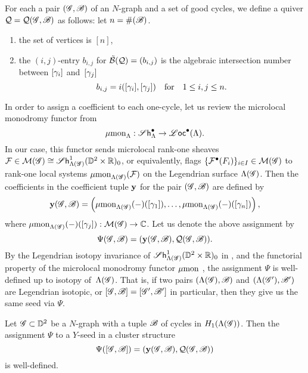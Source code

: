 \begin{definition} 
For each a pair $(\mathscr{G}, \mathscr{B})$ of an $N$-graph and a set of good cycles, we define a quiver $\mathcal{Q}=\mathcal{Q}(\mathscr{G},\mathscr{B})$ as follows: let $n=\#(\mathscr{B})$.
\begin{enumerate}
\item the set of vertices is $[n]$, 
\item the $(i,j)$-entry $b_{i,j}$ for $\mathcal{\tilde{B}}(\mathcal{Q})=(b_{i,j})$ is the algebraic intersection number between $[\gamma_i]$ and~$[\gamma_j]$
\[
b_{i,j} = i([\gamma_i], [\gamma_j])\quad\text{for}\quad 1\le i, j\le n.
\]
\end{enumerate}
\end{definition}

In order to assign a coefficient to each one-cycle, let us review  the microlocal monodromy functor from \cite{STZ2017}
\[
\operatorname{\mu mon}_\Lambda:\operatorname{\mathscr{S}\mathsf{h}}_\Lambda^\bullet \to\operatorname{\mathscr{L}\mathsf{oc}}^\bullet(\Lambda).
\]
In our case, this functor sends microlocal rank-one sheaves $\mathcal{F} \in \mathcal{M}(\mathscr{G})\cong \operatorname{\mathscr{S}\mathsf{h}}_{\Lambda(\mathscr{G})}^1(\mathbb{D}^2\times \mathbb{R})_0$, or equivalently, flags $\{\mathcal{F}^\bullet(F_i)\}_{i \in I}\in\mathcal{M}(\mathscr{G})$ to rank-one local systems $\operatorname{\mu mon}_{\Lambda(\mathscr{G})}(\mathcal{F})$ on the Legendrian surface $\Lambda(\mathscr{G})$. 
Then the coefficients in the coefficient tuple $\mathbf{y}$ for the pair $(\mathscr{G}, \mathscr{B})$ are defined by
\[
\mathbf{y}(\mathscr{G},\mathscr{B})=\left(
\operatorname{\mu mon}_{\Lambda(\mathscr{G})}(-)([\gamma_1]),
\dots,
\operatorname{\mu mon}_{\Lambda(\mathscr{G})}(-)([\gamma_n])\right),
\]
where $\operatorname{\mu mon}_{\Lambda(\mathscr{G})}(-)([\gamma_j]):\mathcal{M}(\mathscr{G})\to \mathbb{C}$.  
Let us denote the above assignment by 
\[
\Psi(\mathscr{G}, \mathscr{B})=(\mathbf{y}(\mathscr{G}, \mathscr{B}),\mathcal{Q}(\mathscr{G},\mathscr{B})).
\]
By the Legendrian isotopy invariance of $\operatorname{\mathscr{S}\mathsf{h}}_{\Lambda(\mathscr{G})}^1(\mathbb{D}^2\times \mathbb{R})_0$ in \cite{GKS2012}, and the functorial property of the microlocal monodromy functor $\operatorname{\mu mon}$ \cite{STZ2017}, the assignment $\Psi$ is well-defined up to isotopy of~$\Lambda(\mathscr{G})$. That is, if two pairs $(\Lambda(\mathscr{G}),\mathscr{B})$ and $(\Lambda(\mathscr{G}'),\mathscr{B}')$ are Legendrian isotopic, or $[\mathscr{G}, \mathscr{B}]=[\mathscr{G}',\mathscr{B}']$ in particular, then they give us the same seed via $\Psi$.

\begin{theorem}\cite[\S7.2.1]{CZ2020}\label{thm:N-graph to seed}
Let $\mathscr{G}\subset \mathbb{D}^2$ be a $N$-graph with a tuple $\mathscr{B}$ of cycles in $H_1(\Lambda(\mathscr{G}))$. Then the assignment $\Psi$ to a $Y$-seed in a cluster structure
\[
\Psi([\mathscr{G},\mathscr{B}])= (\mathbf{y}(\mathscr{G},\mathscr{B}),\mathcal{Q}(\mathscr{G},\mathscr{B}))
\]
is well-defined.
\end{theorem}



